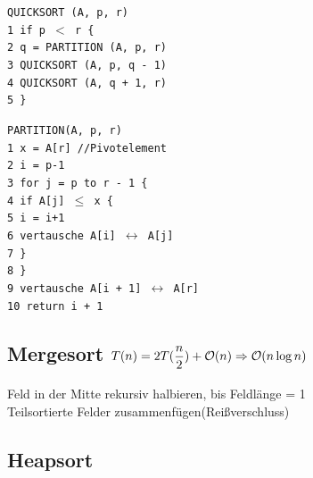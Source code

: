 \documentclass[fs, footer]{latex4ei}
\renewcommand{\t}{\texttt}
\begin{document}
\begin{multicols*}{4}
{{\parbox{4cm}{
\t{QUICKSORT (A, p, r)\\
1\ if p $<$ r \{\\
2\ \quad q = PARTITION (A, p, r)\\
3\ \quad QUICKSORT (A, p, q - 1)\\
4\ \quad QUICKSORT (A, q + 1, r)\\
5\ \}
}}\hspace{-.5cm}
\parbox{4cm}{
\t{PARTITION(A, p, r)\\
1\ x = A[r] //Pivotelement\\
2\ i = p-1 \\
3\ for j = p to r - 1 \{\\
4\ \quad if A[j] $\le$ x \{\\
5\ \qquad i = i+1\\
6\ \qquad vertausche A[i] $\leftrightarrow$ A[j]\\
7\ \quad \}\\
8\ \}\\
9\ vertausche A[i + 1] $\leftrightarrow$ A[r]\\
10\ return i + 1\\}}

\subsection{Mergesort $T(n) = 2T(\dfrac{n}{2}) + \operatorname{\mathcal O}(n) \Rightarrow \operatorname{\mathcal O}(n\log n)$}
Feld in der Mitte rekursiv halbieren, bis Feldlänge = 1\\
Teilsortierte Felder zusammenfügen(Reißverschluss)\\

\iffalse
\subsection{Heapsort}

\begin{multicols}{2}


\end{multicols}}}
\end{multicols*}
\end{document}
